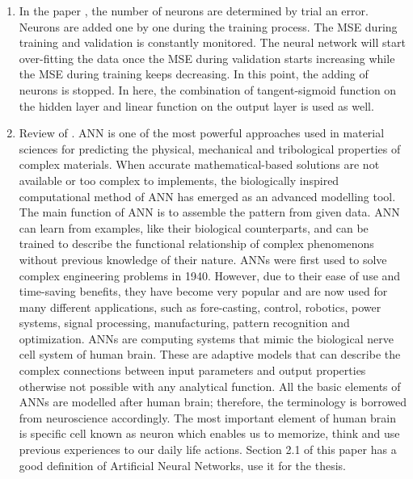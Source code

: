 \begin{enumerate}
    \item In the paper \cite{tho2004artificial}, the number of neurons are determined by trial an error. Neurons are added one by one during the training process. The MSE during training and validation is constantly monitored. The neural network will start over-fitting the data once the MSE during validation starts increasing while the MSE during training keeps decreasing. In this point, the adding of neurons is stopped. In here, the combination of tangent-sigmoid function on the hidden layer and linear function on the output layer is used as well.
    \item Review of \cite{khan2019fabrication}. ANN is one of the most powerful approaches used in material sciences for predicting the physical, mechanical and tribological properties of complex materials. When accurate mathematical-based solutions are not available or too complex to implements, the biologically inspired computational method of ANN has emerged as an advanced modelling tool. The main function of ANN is to assemble the pattern from given data. ANN can learn from examples, like their biological counterparts, and can be trained to describe the functional relationship of complex phenomenons without previous knowledge of their nature. ANNs were first used to solve complex engineering problems in 1940. However, due to their ease of use and time-saving benefits, they have become very popular and are now used for many different applications, such as fore-casting, control, robotics, power systems, signal processing, manufacturing, pattern recognition and optimization. 
    ANNs are computing systems that mimic the biological nerve cell system of human brain. These are adaptive models that can describe the complex connections between input parameters and output properties otherwise not possible with any analytical function. All the basic elements of ANNs are modelled after human brain; therefore, the terminology is borrowed from neuroscience accordingly. The most important element of human brain is specific cell known as neuron which enables us to memorize, think and use previous experiences to our daily life actions. 
    Section 2.1 of this paper has a good definition of Artificial Neural Networks, use it for the thesis.

\end{enumerate}
